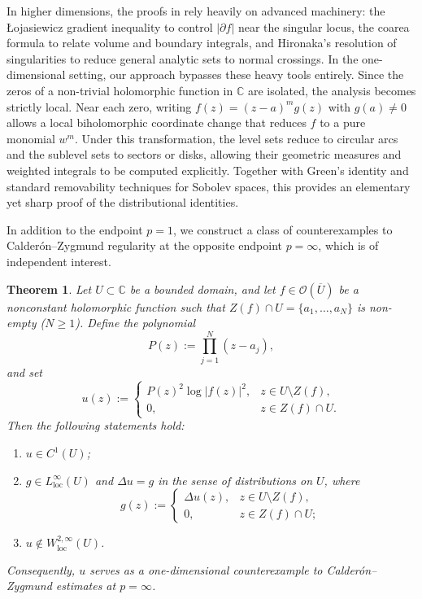 \documentclass[12pt,twoside]{amsart}
\numberwithin{equation}{section}
\newtheorem{theorem}{Theorem}[section]
\numberwithin{definition}{section} %
\begin{document}
In higher dimensions, the proofs in \cite{psww2026} rely heavily on advanced machinery: the \L{}ojasiewicz gradient inequality to control $|\partial f|$ near the singular locus, the coarea formula to relate volume and boundary integrals, and Hironaka's resolution of singularities to reduce general analytic sets to normal crossings. In the one-dimensional setting, our approach bypasses these heavy tools entirely. Since the zeros of a non-trivial holomorphic function in $\mathbb{C}$ are isolated, the analysis becomes strictly local. Near each zero, writing $f(z) = (z-a)^m g(z)$ with $g(a) \neq 0$ allows a local biholomorphic coordinate change that reduces $f$ to a pure monomial $w^m$. Under this transformation, the level sets reduce to circular arcs and the sublevel sets to sectors or disks, allowing their geometric measures and weighted integrals to be computed explicitly. Together with Green's identity and standard removability techniques for Sobolev spaces, this provides an elementary yet sharp proof of the distributional identities.

\medskip
In addition to the endpoint $p = 1$, we construct a class of counterexamples to Calder\'on--Zygmund regularity at the opposite endpoint $p = \infty$, which is of independent interest.

\begin{theorem}\label{Linfty}
Let $U \subset \mathbb{C}$ be a bounded domain, and let $f \in \mathcal{O}(\overline{U})$ be a nonconstant holomorphic function such that $Z(f) \cap U = \{a_1, \dots, a_N\}$ is non-empty ($N \ge 1$). Define the polynomial
\[
P(z) := \prod_{j=1}^N (z-a_j),
\]
and set
\[
u(z) :=
\begin{cases}
P(z)^2 \log |f(z)|^2, & z \in U \setminus Z(f),\\[4pt]
0, & z \in Z(f) \cap U.
\end{cases}
\]
Then the following statements hold:
\begin{enumerate}
    \item $u \in C^1(U)$;
    \item $g \in L^\infty_{\mathrm{loc}}(U)$ and $\Delta u = g$ in the sense of distributions on $U$, where
    \begin{equation}
    g(z) :=
    \begin{cases}
    \Delta u(z), & z \in U \setminus Z(f),\\[4pt]
    0, & z \in Z(f) \cap U;
    \end{cases}
    \end{equation}
    \item $u \notin W^{2,\infty}_{\mathrm{loc}}(U)$.
\end{enumerate}
Consequently, $u$ serves as a one-dimensional counterexample to Calder\'on--Zygmund estimates at $p = \infty$.
\end{theorem}
\end{document}
